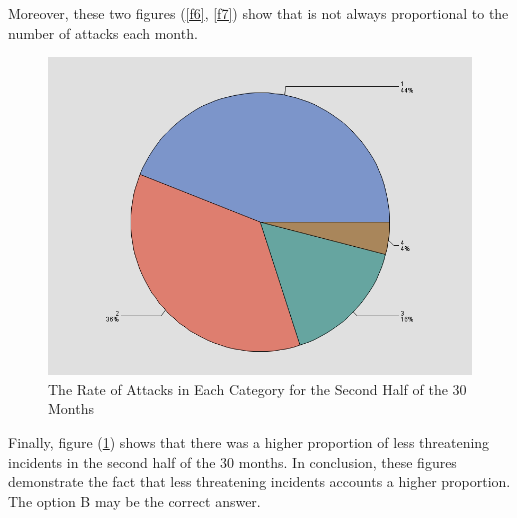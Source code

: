 Moreover, these two figures (\ref{f6}, \ref{f7}) show that is not always
proportional to the number of attacks each month.

\begin{figure}[H]
\centering
\includegraphics[scale=0.5]{Pic/Q2/4.png}
\caption{The Rate of Attacks in Each Category for the Second Half
of the 30 Months}
\label{f8}
\end{figure}
Finally, figure (\ref{f8}) shows that there was a higher proportion of less threatening incidents in the second half
of the 30 months. In conclusion, these figures demonstrate the fact that less threatening incidents accounts a higher proportion. The option B may be the correct answer.
